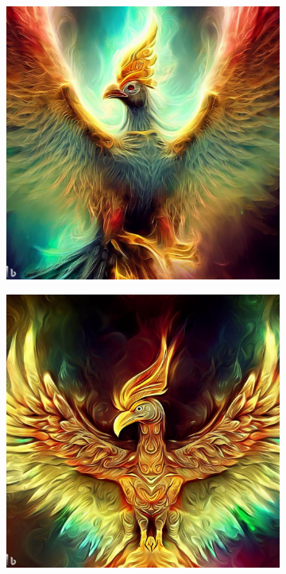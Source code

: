\documentclass[11pt, twoside]{article}
\begin{document}
\begin{figure}[H]
\begin{subfigure}{0.3\textwidth}
    \includegraphics[width=0.99\linewidth]{garuda2.jpeg}
  \end{subfigure}%
  \begin{subfigure}{0.3\textwidth}
    \centering
    \includegraphics[width=0.99\linewidth]{garuda3.jpeg}
  \end{subfigure}
\end{figure}
\end{document}
